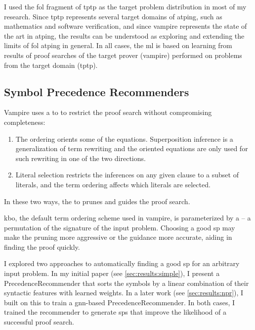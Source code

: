 I used the \gls{fol} fragment of \gls{tptp} as the target problem distribution in most of my research.
Since \gls{tptp} represents several target domains of \gls{atping},
such as mathematics and software verification,
and since \gls{vampire} represents the state of the art in \gls{atping},
the results can be understood as exploring and extending the limits of \gls{fol} \gls{atping} in general.
In all cases, the \gls{ml} is based on learning from results of proof searches of the target prover (\gls{vampire}) performed on problems from the target domain (\gls{tptp}).

\subsection{Symbol Precedence Recommenders}
\label{sec:contrib:SymbolPrecedenceRecommenders}

Vampire uses a \gls{to} \cite{} to restrict the proof search without compromising completeness:
\begin{enumerate}
\item The ordering orients some of the equations.
Superposition inference is a generalization of term rewriting
and the oriented equations are only used for such rewriting in one of the two directions.
\item Literal selection restricts the inferences on any given clause to a subset of literals, and the term ordering affects which literals are selected.
\end{enumerate}
In these two ways, the \gls{to} prunes and guides the proof search.

\Gls{kbo}, the default term ordering scheme used in \gls{vampire}, is parameterized by a  -- a permutation of the \gls{signature} of the input problem.
Choosing a good \gls{sp} may make the pruning more aggressive or the guidance more accurate,
aiding in finding the proof quickly.

I explored two approaches to automatically finding a good \gls{sp} for an arbitrary input problem.
In my initial paper \cite{DBLP:conf/cade/Bartek020} (see \cref{sec:results:simple}), I present a \gls{PrecedenceRecommender} that sorts the symbols by a linear combination of their syntactic features with learned weights.
In a later work \cite{DBLP:conf/cade/Bartek021} (see \cref{sec:results:npr}), I built on this to train a \acrshort{gnn}-based \gls{PrecedenceRecommender}.
In both cases, I trained the recommender to generate \glspl{sp} that improve the likelihood of a successful proof search.

